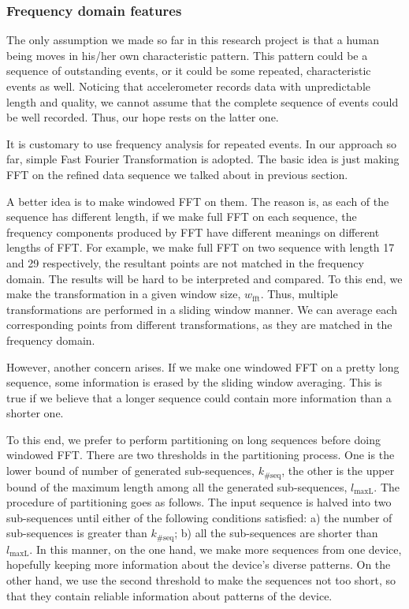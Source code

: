 \documentclass{article} %
\begin{document}
\subsubsection{Frequency domain features}
The only assumption we made so far in this research project is that a human being moves in his/her own characteristic pattern. This pattern could be a sequence of outstanding events, or it could be some repeated, characteristic events as well. Noticing that accelerometer records data with unpredictable length and quality, we cannot assume that the complete sequence of events could be well recorded. Thus, our hope rests on the latter one. 

It is customary to use frequency analysis for repeated events. In our approach so far, simple Fast Fourier Transformation is adopted. The basic idea is just making FFT on the refined data sequence we talked about in previous section.

A better idea is to make windowed FFT on them. The reason is, as each of the sequence has different length, if we make full FFT on each sequence, the frequency components produced by FFT have different meanings on different lengths of FFT. For example, we make full FFT on two sequence with length 17 and 29 respectively, the resultant points are not matched in the frequency domain. The results will be hard to be interpreted and compared. To this end, we make the transformation in a given window size, $w_\mathrm{fft}$. Thus, multiple transformations are performed in a sliding window manner. We can average each corresponding points from different transformations, as they are matched in the frequency domain. 

However, another concern arises. If we make one windowed FFT on a pretty long sequence, some information is erased by the sliding window averaging. This is true if we believe that a longer sequence could contain more information than a shorter one.

To this end, we prefer to perform partitioning on long sequences before doing windowed FFT. There are two thresholds in the partitioning process. One is the lower bound of number of generated sub-sequences, $k_\mathrm{\#seq}$, the other is the upper bound of the maximum length among all the generated sub-sequences, $l_\mathrm{maxL}$. The procedure of partitioning goes as follows. The input sequence is halved into two sub-sequences until either of the following conditions satisfied: a) the number of sub-sequences is greater than $k_\mathrm{\#seq}$; b) all the sub-sequences are shorter than $l_\mathrm{maxL}$. In this manner, on the one hand, we make more sequences from one device, hopefully keeping more information about the device's diverse patterns. On the other hand, we use the second threshold to make the sequences not too short, so that they contain reliable information about patterns of the device.
\end{document}
